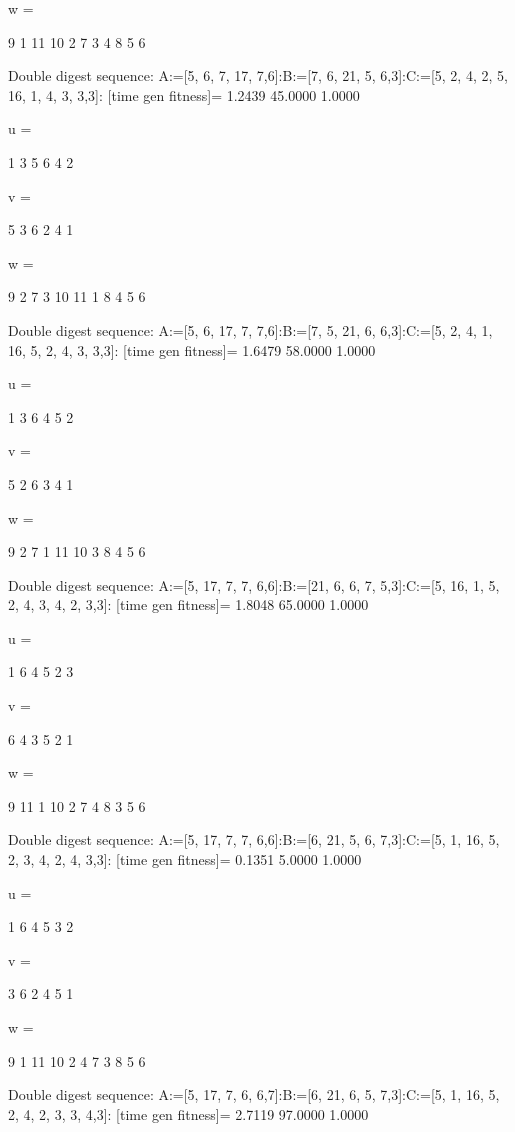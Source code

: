 w =

     9     1    11    10     2     7     3     4     8     5     6

Double digest sequence:
A:=[5, 6, 7, 17, 7,6]:B:=[7, 6, 21, 5, 6,3]:C:=[5, 2, 4, 2, 5, 16, 1, 4, 3, 3,3]:
[time gen fitness]=
    1.2439   45.0000    1.0000


u =

     1     3     5     6     4     2


v =

     5     3     6     2     4     1


w =

     9     2     7     3    10    11     1     8     4     5     6

Double digest sequence:
A:=[5, 6, 17, 7, 7,6]:B:=[7, 5, 21, 6, 6,3]:C:=[5, 2, 4, 1, 16, 5, 2, 4, 3, 3,3]:
[time gen fitness]=
    1.6479   58.0000    1.0000


u =

     1     3     6     4     5     2


v =

     5     2     6     3     4     1


w =

     9     2     7     1    11    10     3     8     4     5     6

Double digest sequence:
A:=[5, 17, 7, 7, 6,6]:B:=[21, 6, 6, 7, 5,3]:C:=[5, 16, 1, 5, 2, 4, 3, 4, 2, 3,3]:
[time gen fitness]=
    1.8048   65.0000    1.0000


u =

     1     6     4     5     2     3


v =

     6     4     3     5     2     1


w =

     9    11     1    10     2     7     4     8     3     5     6

Double digest sequence:
A:=[5, 17, 7, 7, 6,6]:B:=[6, 21, 5, 6, 7,3]:C:=[5, 1, 16, 5, 2, 3, 4, 2, 4, 3,3]:
[time gen fitness]=
    0.1351    5.0000    1.0000


u =

     1     6     4     5     3     2


v =

     3     6     2     4     5     1


w =

     9     1    11    10     2     4     7     3     8     5     6

Double digest sequence:
A:=[5, 17, 7, 6, 6,7]:B:=[6, 21, 6, 5, 7,3]:C:=[5, 1, 16, 5, 2, 4, 2, 3, 3, 4,3]:
[time gen fitness]=
    2.7119   97.0000    1.0000


